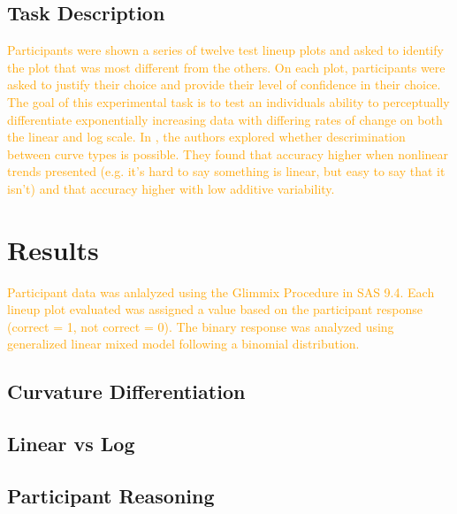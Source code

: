 \documentclass[]{interact}
\theoremstyle{plain}%
\theoremstyle{definition}
\theoremstyle{remark}
\begin{document}
\hypertarget{task-description}{%
\subsection{Task Description}\label{task-description}}

\textcolor{Orange}{Participants were shown a series of twelve test lineup plots and asked to identify the plot that was most different from the others. 
On each plot, participants were asked to justify their choice and provide their level of confidence in their choice.
The goal of this experimental task is to test an individuals ability to perceptually differentiate exponentially increasing data with differing rates of change on both the linear and log scale. 
In \cite{best_perception_2007}, the authors explored whether descrimination between curve types is possible. 
They found that accuracy higher when nonlinear trends presented (e.g. it’s hard to say something is linear, but easy to say that it isn’t) and that accuracy higher with low additive variability.
}

\hypertarget{results}{%
\section{Results}\label{results}}

\textcolor{Orange}{
Participant data was anlalyzed using the Glimmix Procedure in SAS 9.4. Each lineup plot evaluated was assigned a value based on the participant response (correct = 1, not correct = 0). The binary response was analyzed using generalized linear mixed model following a binomial distribution. 
}

\hypertarget{curvature-differentiation}{%
\subsection{Curvature Differentiation}\label{curvature-differentiation}}

\hypertarget{linear-vs-log}{%
\subsection{Linear vs Log}\label{linear-vs-log}}

\hypertarget{participant-reasoning}{%
\subsection{Participant Reasoning}\label{participant-reasoning}}
\end{document}

